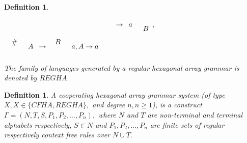 \documentclass[11pt]{article}
\newtheorem{definition}[theorem]{Definition}
\begin{document}
\begin{definition}
\[\begin{array}{*{20}c}
{\begin{array}{*{20}c}
\end{array}}  \\
\end{array} \to \begin{array}{*{20}c}
   a & {\begin{array}{*{20}c}
   {}  \\
   B  \\
\end{array},}  \\
\end{array}
\]
$
\begin{array}{*{20}c}
   {\begin{array}{*{20}c}
   \#   \\
   {}  \\
\end{array}} & A  \\
\end{array} \to \begin{array}{*{20}c}
   {\begin{array}{*{20}c}
   B  \\
   {}  \\
\end{array}} & {a,A \to a}  \\
\end{array}
$

The family of languages generated by a regular hexagonal array grammar is denoted by $REGHA.$
\end{definition}
\begin{definition}A cooperating hexagonal array grammar system (of type $X,X\in\{CFHA,REGHA\},$ and degree $n,n\ge 1$), is a construct $\Gamma=(N,T,S,P_1,P_2,\ldots,P_n),$ where $N$ and $T$ are non-terminal and terminal alphabets respectively,
$S \in N$ and $P_1,P_2,\ldots,P_n$ are finite sets of regular
respectively context free rules over $N\cup T.$
\end{definition}
\end{document}
